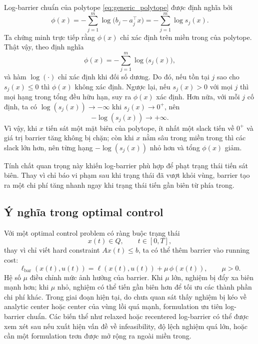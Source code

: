 \documentclass[12pt]{article}
\begin{document}
Log-barrier chuẩn của polytope \eqref{eq:generic_polytope} được định nghĩa bởi
\begin{equation}
\phi(x)=-\sum_{j=1}^{m}\log\bigl(b_j-a_j^\top x\bigr)
= -\sum_{j=1}^{m}\log s_j(x).
\label{eq:generic_log_barrier}
\end{equation}
Ta chứng minh trực tiếp rằng $\phi(x)$ chỉ xác định trên miền trong của polytope. Thật vậy, theo định nghĩa
\begin{equation}
\phi(x)=-\sum_{j=1}^{m}\log\bigl(s_j(x)\bigr),
\end{equation}
và hàm $\log(\cdot)$ chỉ xác định khi đối số dương. Do đó, nếu tồn tại $j$ sao cho $s_j(x)\le 0$ thì $\phi(x)$ không xác định. Ngược lại, nếu $s_j(x)>0$ với mọi $j$ thì mọi hạng trong tổng đều hữu hạn, suy ra $\phi(x)$ xác định. Hơn nữa, với mỗi $j$ cố định, ta có $\log(s_j(x))\to -\infty$ khi $s_j(x)\to 0^+$, nên
\begin{equation}
-\log(s_j(x))\to +\infty.
\end{equation}
Vì vậy, khi $x$ tiến sát một mặt biên của polytope, ít nhất một slack tiến về $0^+$ và giá trị barrier tăng không bị chặn; còn khi $x$ nằm sâu trong miền trong thì các slack lớn hơn, nên từng hạng $-\log(s_j(x))$ nhỏ hơn và tổng $\phi(x)$ giảm.

Tính chất quan trọng này khiến log-barrier phù hợp để phạt trạng thái tiến sát biên. Thay vì chỉ báo vi phạm sau khi trạng thái đã vượt khỏi vùng, barrier tạo ra một chi phí tăng nhanh ngay khi trạng thái tiến gần biên từ phía trong.

\subsection{Ý nghĩa trong optimal control}

Với một optimal control problem có ràng buộc trạng thái
\begin{equation}
x(t)\in Q,
\qquad t\in[0,T],
\label{eq:ocp_state_in_Q}
\end{equation}
thay vì chỉ viết hard constraint $Ax(t)\le b$, ta có thể thêm barrier vào running cost:
\begin{equation}
\ell_{\mathrm{bar}}(x(t),u(t))
=
\ell(x(t),u(t))+\mu\,\phi(x(t)),
\qquad \mu>0.
\label{eq:bar_running_cost_generic}
\end{equation}
Hệ số $\mu$ điều chỉnh mức ảnh hưởng của barrier. Khi $\mu$ lớn, nghiệm bị đẩy xa biên mạnh hơn; khi $\mu$ nhỏ, nghiệm có thể tiến gần biên hơn để tối ưu các thành phần chi phí khác. Trong giai đoạn hiện tại, do chưa quan sát thấy nghiệm bị kéo về analytic center hoặc center của vùng lồi quá mạnh, formulation ưu tiên log-barrier chuẩn. Các biến thể như relaxed hoặc recentered log-barrier có thể được xem xét sau nếu xuất hiện vấn đề về infeasibility, độ lệch nghiệm quá lớn, hoặc cần một formulation trơn được mở rộng ra ngoài miền trong.
\end{document}
